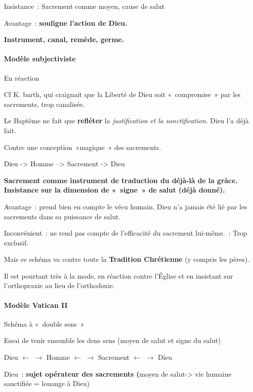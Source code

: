 Insistance~: Sacrement comme moyen, cause de salut

Avantage~: \textbf{souligne l'action de Dieu.}

\textbf{Instrument, canal, remède, germe.}

\hypertarget{moduxe8le-subjectiviste}{%
\paragraph{Modèle subjectiviste}\label{moduxe8le-subjectiviste}}

En réaction

Cf K. barth, qui craignait que la Liberté de Dieu soit «~compromise~»
par les sacrements, trop canalisée.

Le Baptême ne fait que \textbf{refléter} la \emph{justification et la
sanctification.} Dieu l'a déjà fait.

Contre une conception~»magique~» des sacrements.

Dieu -\textgreater{} Homme --\textgreater{} Sacrement -\textgreater{}
Dieu

\textbf{Sacrement comme instrument de traduction du déjà-là de la grâce.
Insistance sur la dimension de «~signe~» de salut (déjà donné).}

Avantage~: prend bien en compte le vécu humain. Dieu n'a jamais été lié
par les sacrements dans sa puissance de salut.

Inconvénient~: ne rend pas compte de l'efficacité du sacrement
lui-même.~: Trop exclusif.

Mais ce schéma va contre toute la \textbf{Tradition Chrétienne }(y
compris les pères).

Il est pourtant très à la mode, en réaction contre l'Église et en
insistant sur l'orthopraxie au lieu de l'orthodoxie.

\hypertarget{moduxe8le-vatican-ii}{%
\paragraph{Modèle Vatican II}\label{moduxe8le-vatican-ii}}

Schéma à «~double sens~»

Essai de tenir ensemble les dens sens (moyen de salut et signe du salut)

Dieu $\leftarrow$ $\rightarrow$ Homme $\leftarrow$ $\rightarrow$ Sacrement $\leftarrow$ $\rightarrow$ Dieu

Dieu~: \textbf{sujet opérateur des sacrements (}moyen de
salut-\textgreater{} vie humaine sanctifiée = louange à Dieu)

